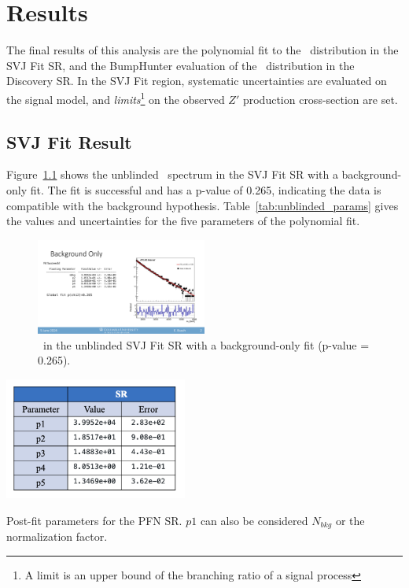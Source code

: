 \chapter{Results}
\label{ch:results}
The final results of this analysis are the polynomial fit to the \mt~distribution in the SVJ Fit SR, and the BumpHunter evaluation of the \mt~distribution in the Discovery SR. In the SVJ Fit region, systematic uncertainties are evaluated on the signal model, and \textit{limits}\footnote{A limit is an upper bound of the branching ratio of a signal process} on the observed $Z'$ production cross-section are set. 

\section{SVJ Fit Result}
\label{sec:results_svj}
Figure~\ref{fig:unblinded_PFN_bonly} shows the unblinded \mt~spectrum in the SVJ Fit SR with a background-only fit. 
The fit is successful and has a p-value of 0.265, indicating the data is compatible with the background hypothesis. 
Table~\ref{tab:unblinded_params} gives the values and uncertainties for the five parameters of the polynomial fit.
\begin{figure}[!htbp]
\centering
   \includegraphics[width=0.5\textwidth]{figures/results/unblinded_PFN_bonly}
    \caption{\mt~in the unblinded SVJ Fit SR with a background-only fit (p-value = 0.265).
    \label{fig:unblinded_PFN_bonly}}
\end{figure}

\begin{table}[!htbp]
\centering
   \includegraphics[width=0.45\textwidth]{figures/results/postfit_param_pfnSR}
    \caption{Post-fit parameters for the PFN SR. $p1$ can also be considered $N_{bkg}$ or the normalization factor.
    \label{tab:unblinded_params}}
\end{table}

